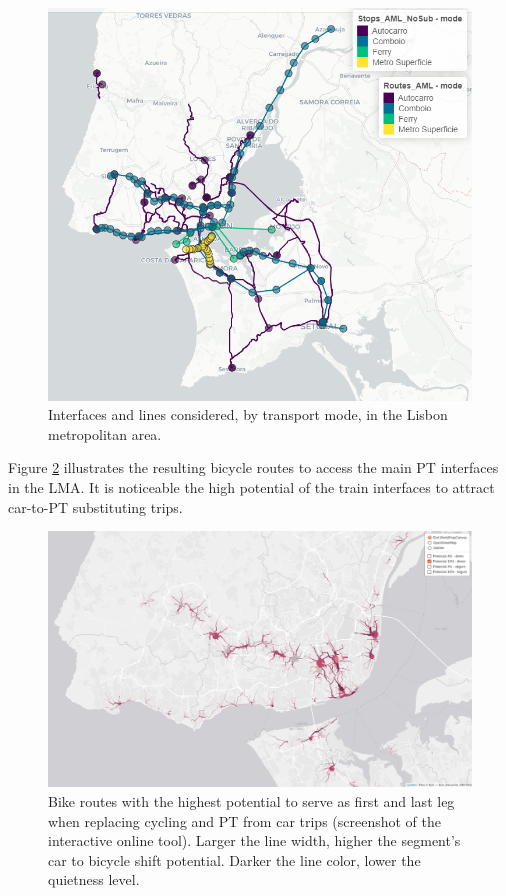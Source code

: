 \documentclass[review, doubleblind, 3p,
authoryear]{elsarticle} %
\begin{document}
\begin{figure}

{\centering \includegraphics[width=0.6\linewidth,]{img/map1} 

}

\caption{Interfaces and lines considered, by transport mode, in the Lisbon metropolitan area.}\label{fig:map1}
\end{figure}

Figure \ref{fig:map2} illustrates the resulting bicycle routes to access
the main PT interfaces in the LMA. It is noticeable the high potential
of the train interfaces to attract car-to-PT substituting trips.

\begin{figure}

{\centering \includegraphics[width=0.8\linewidth,]{img/map2} 

}

\caption{Bike routes with the highest potential to serve as first and last leg when replacing cycling and PT from car trips (screenshot of the interactive online tool). Larger the line width, higher the segment's car to bicycle shift potential. Darker the line color, lower the quietness level.}\label{fig:map2}
\end{figure}
\end{document}
